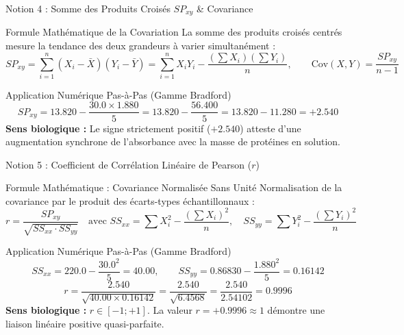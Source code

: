 \documentclass[aspectratio=169,10pt]{beamer}
\begin{document}
\begin{frame}{Notion 4 : Somme des Produits Croisés $SP_{xy}$ \& Covariance}
  \begin{conceptbox}{Formule Mathématique de la Covariation}
    \footnotesize
    La somme des produits croisés centrés mesure la tendance des deux grandeurs à varier simultanément :
    \begin{equation*}
      SP_{xy} = \sum_{i=1}^n (X_i - \bar{X})(Y_i - \bar{Y}) = \sum_{i=1}^n X_i Y_i - \frac{(\sum X_i)(\sum Y_i)}{n}, \qquad \text{Cov}(X,Y) = \frac{SP_{xy}}{n - 1}
    \end{equation*}
  \end{conceptbox}
  \vspace{1mm}
  \begin{biobox}{Application Numérique Pas-à-Pas (Gamme Bradford)}
    \footnotesize
    \begin{equation*}
      SP_{xy} = 13.820 - \frac{30.0 \times 1.880}{5} = 13.820 - \frac{56.400}{5} = 13.820 - 11.280 = \mathbf{+2.540}
    \end{equation*}
    \textbf{Sens biologique :}
    Le signe strictement positif ($+2.540$) atteste d'une augmentation synchrone de l'absorbance avec la masse de protéines en solution.
  \end{biobox}
\end{frame}

\begin{frame}{Notion 5 : Coefficient de Corrélation Linéaire de Pearson ($r$)}
  \begin{conceptbox}{Formule Mathématique : Covariance Normalisée Sans Unité}
    \footnotesize
    Normalisation de la covariance par le produit des écarts-types échantillonnaux :
    \begin{equation*}
      r = \frac{SP_{xy}}{\sqrt{SS_{xx} \cdot SS_{yy}}} \quad \text{avec } 
      SS_{xx} = \sum X_i^2 - \frac{(\sum X_i)^2}{n}, \quad SS_{yy} = \sum Y_i^2 - \frac{(\sum Y_i)^2}{n}
    \end{equation*}
  \end{conceptbox}
  \vspace{1mm}
  \begin{biobox}{Application Numérique Pas-à-Pas (Gamme Bradford)}
    \footnotesize
    \begin{equation*}
      SS_{xx} = 220.0 - \frac{30.0^2}{5} = \mathbf{40.00}, \qquad SS_{yy} = 0.86830 - \frac{1.880^2}{5} = \mathbf{0.16142}
    \end{equation*}
    \begin{equation*}
      r = \frac{2.540}{\sqrt{40.00 \times 0.16142}} = \frac{2.540}{\sqrt{6.4568}} = \frac{2.540}{2.54102} = \mathbf{0.9996}
    \end{equation*}
    \textbf{Sens biologique :} $r \in [-1; +1]$. La valeur $r = +0.9996 \approx 1$ démontre une liaison linéaire positive quasi-parfaite.
  \end{biobox}
\end{frame}
\end{document}
